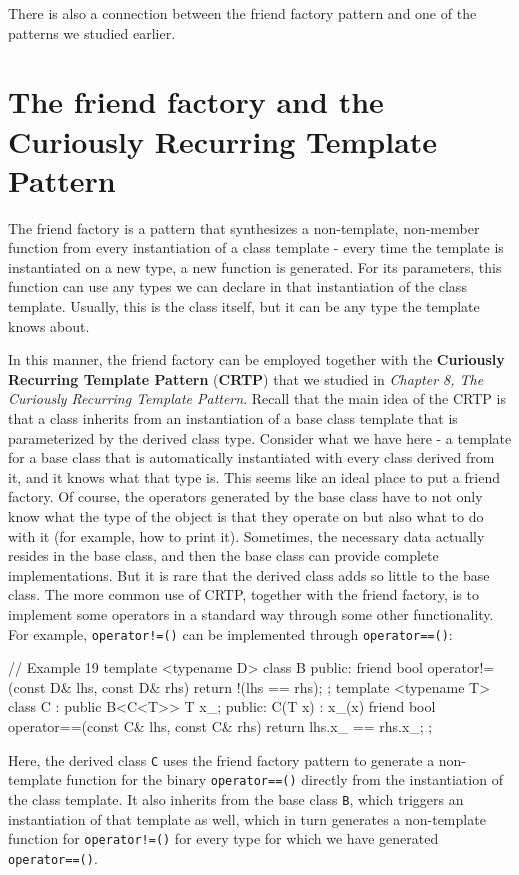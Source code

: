 There is also a connection between the friend factory pattern and one of the patterns we studied earlier.

\section{The friend factory and the Curiously Recurring Template Pattern}

The friend factory is a pattern that synthesizes a non-template, non-member function from every instantiation of a class template - every time the template is instantiated on a new type, a new function is generated. For its parameters, this function can use any types we can declare in that instantiation of the class template. Usually, this is the class itself, but it can be any type the template knows about.

In this manner, the friend factory can be employed together with the \textbf{Curiously Recurring Template Pattern} (\textbf{CRTP}) that we studied in \emph{Chapter 8, The Curiously Recurring Template Pattern}. Recall that the main idea of the CRTP is that a class inherits from an instantiation of a base class template that is parameterized by the derived class type. Consider what we have here - a template for a base class that is automatically instantiated with every class derived from it, and it knows what that type is. This seems like an ideal place to put a friend factory. Of course, the operators generated by the base class have to not only know what the type of the object is that they operate on but also what to do with it (for example, how to print it). Sometimes, the necessary data actually resides in the base class, and then the base class can provide complete implementations. But it is rare that the derived class adds so little to the base class. The more common use of CRTP, together with the friend factory, is to implement some operators in a standard way through some other functionality. For example, \texttt{operator!=()} can be implemented through \texttt{operator==()}:

\begin{code}
// Example 19
template <typename D> class B {
  public:
  friend bool operator!=(const D& lhs, const D& rhs) {
    return !(lhs == rhs);
  }
};
template <typename T> class C : public B<C<T>> {
  T x_;
  public:
  C(T x) : x_(x) {}
  friend bool operator==(const C& lhs, const C& rhs) {
    return lhs.x_ == rhs.x_;
  }
};
\end{code}

Here, the derived class \texttt{C} uses the friend factory pattern to generate a non-template function for the binary \texttt{operator==()} directly from the instantiation of the class template. It also inherits from the base class \texttt{B}, which triggers an instantiation of that template as well, which in turn generates a non-template function for \texttt{operator!=()} for every type for which we have generated \texttt{operator==()}.

